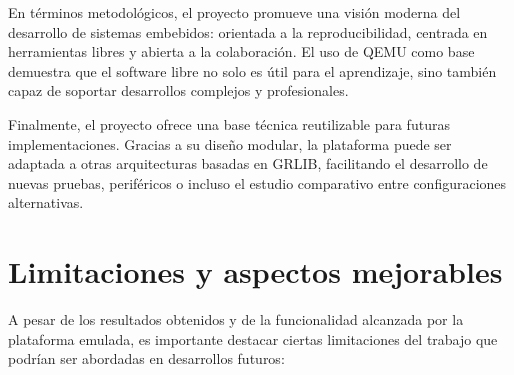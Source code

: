 En términos metodológicos, el proyecto promueve una visión moderna del desarrollo de sistemas embebidos: orientada a la reproducibilidad, centrada en herramientas libres y abierta a la colaboración. El uso de QEMU como base demuestra que el software libre no solo es útil para el aprendizaje, sino también capaz de soportar desarrollos complejos y profesionales.

Finalmente, el proyecto ofrece una base técnica reutilizable para futuras implementaciones. Gracias a su diseño modular, la plataforma puede ser adaptada a otras arquitecturas basadas en GRLIB, facilitando el desarrollo de nuevas pruebas, periféricos o incluso el estudio comparativo entre configuraciones alternativas.

\section{Limitaciones y aspectos mejorables}

A pesar de los resultados obtenidos y de la funcionalidad alcanzada por la plataforma emulada, es importante destacar ciertas limitaciones del trabajo que podrían ser abordadas en desarrollos futuros:

